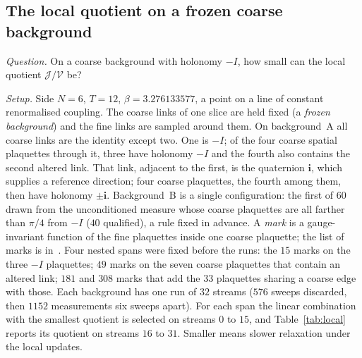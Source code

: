 \subsection{The local quotient on a frozen coarse background}\label{s:local}
\emph{Question.} On a coarse background with holonomy $-I$, how small can the local quotient
$\mathcal J/\mathcal V$ be?

\emph{Setup.} Side $N=6$, $T=12$, $\beta=3.276133577$, a point on a line of constant renormalised coupling.
The coarse links of one slice are held fixed (a \emph{frozen background}) and the fine links are sampled
around them. On background~A all coarse links are the identity except two. One is $-I$; of the four coarse
spatial plaquettes through it, three have holonomy $-I$ and the fourth also contains the second altered link.
That link, adjacent to the first, is the quaternion $\mathbf i$, which supplies a reference direction; four
coarse plaquettes, the fourth among them, then have holonomy $\pm\mathbf i$. Background~B is a single
configuration: the first of $60$ drawn from the unconditioned measure whose coarse plaquettes are all farther
than $\pi/4$ from $-I$ ($40$ qualified), a rule fixed in advance. A \emph{mark} is a gauge-invariant function
of the fine plaquettes inside one coarse plaquette; the list of marks is in~\cite{RepoData}. Four nested spans
were fixed before the runs: the $15$ marks on the three $-I$ plaquettes; $49$ marks on the seven coarse
plaquettes that contain an altered link; $181$ and $308$ marks that add the $33$ plaquettes sharing a coarse
edge with those. Each background has one run of $32$ streams ($576$ sweeps discarded, then $1152$ measurements
six sweeps apart). For each span the linear combination with the smallest quotient is selected on streams $0$
to $15$, and Table~\ref{tab:local} reports its quotient on streams $16$ to $31$. Smaller means slower
relaxation under the local updates.

